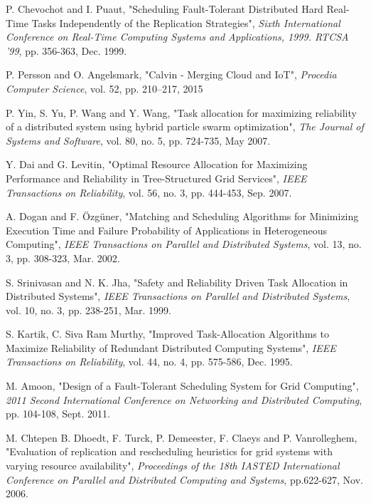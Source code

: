 \documentclass{cslthse-msc}
\begin{document}
\begin{thebibliography}{50}
	P. Chevochot and I. Puaut,
	"Scheduling Fault-Tolerant Distributed Hard Real-Time Tasks Independently of the Replication Strategies",
	\emph{Sixth International Conference on Real-Time Computing Systems and Applications, 1999. RTCSA '99}, pp. 356-363, Dec. 1999.

	P. Persson and O. Angelsmark,
	"Calvin - Merging Cloud and IoT",
	\emph{Procedia Computer Science}, vol. 52, pp. 210–217, 2015

	P. Yin, S. Yu, P. Wang and Y. Wang,
	"Task allocation for maximizing reliability of a distributed system using hybrid particle swarm optimization",
	\emph{The Journal of Systems and Software}, vol. 80, no. 5, pp. 724-735, May 2007.

	Y. Dai and G. Levitin,
	"Optimal Resource Allocation for Maximizing Performance and Reliability in Tree-Structured Grid Services",
	\emph{IEEE Transactions on Reliability}, vol. 56, no. 3, pp. 444-453, Sep. 2007.

	A. Dogan and F. Özgüner,
	"Matching and Scheduling Algorithms for Minimizing Execution Time and Failure Probability of Applications in Heterogeneous Computing",
	\emph{IEEE Transactions on Parallel and Distributed Systems}, vol. 13, no. 3, pp. 308-323, Mar. 2002.

	S. Srinivasan and N. K. Jha,
	"Safety and Reliability Driven Task Allocation in Distributed Systems",
	\emph{IEEE Transactions on Parallel and Distributed Systems}, vol. 10, no. 3, pp. 238-251, Mar. 1999.

	S. Kartik, C. Siva Ram Murthy,
	"Improved Task-Allocation Algorithms to Maximize Reliability of Redundant Distributed Computing Systems",
	\emph{IEEE Transactions on Reliability}, vol. 44, no. 4, pp. 575-586, Dec. 1995.

	M. Amoon,
	"Design of a Fault-Tolerant Scheduling System for Grid Computing",
	\emph{2011 Second International Conference on Networking and Distributed Computing}, pp. 104-108, Sept. 2011.

	M. Chtepen B. Dhoedt, F. Turck, P. Demeester, F. Claeys and P. Vanrolleghem, 
	"Evaluation of replication and rescheduling heuristics for grid systems with varying resource availability",
	\emph{Proceedings of the 18th IASTED International Conference on Parallel and Distributed Computing and Systems}, pp.622-627, Nov. 2006.


\end{thebibliography}
\end{document}
